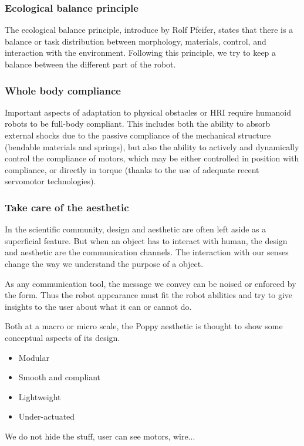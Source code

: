 \subsubsection{Ecological balance principle} %
The ecological balance principle, introduce by Rolf Pfeifer, states that there is a balance or task distribution between morphology, materials, control, and interaction with the environment.
Following this principle, we try to keep a balance between the different part of the robot.

\subsubsection{Whole body compliance} %
Important aspects of adaptation to physical obstacles or HRI require humanoid robots to be full-body compliant.
This includes both the ability to absorb external shocks due to the passive compliance of the mechanical structure (bendable materials and springs), but also the ability to actively and dynamically control the compliance of motors, which may be either controlled in position with compliance, or directly in torque (thanks to the use of adequate recent servomotor technologies).

\subsubsection{Take care of the aesthetic} %
In the scientific community, design and aesthetic are often left aside as a superficial feature.
But when an object has to interact with human, the design and aesthetic are the communication channels.
The interaction with our senses change the way we understand the purpose of a object.

As any communication tool, the message we convey can be noised or enforced by the form.
Thus the robot appearance must fit the robot abilities and try to give insights to the user about what it can or cannot do.

Both at a macro or micro scale, the Poppy aesthetic is thought to show some conceptual aspects of its design.
\begin{itemize}
    \item Modular
    \item Smooth and compliant
    \item Lightweight
    \item Under-actuated
\end{itemize}

We do not hide the stuff, user can see motors, wire...



